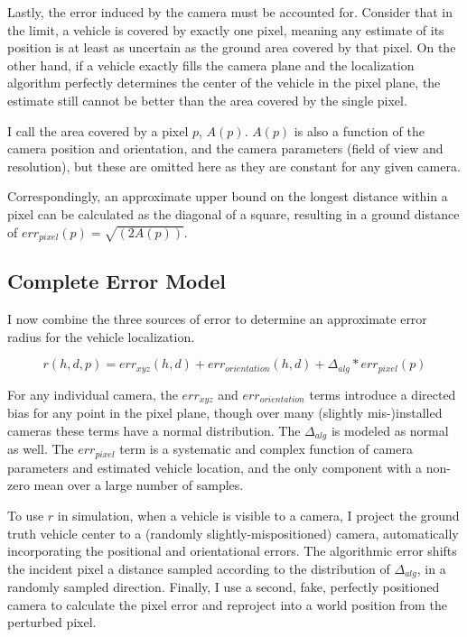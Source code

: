 \documentclass[a4paper,12pt,twoside,openright]{report}
\begin{document}
Lastly, the error induced by the camera must be accounted for. Consider that 
in the limit, a vehicle is covered by exactly one pixel, meaning any estimate
of its position is at least as uncertain as the ground area 
covered by that pixel. On the other hand, if a vehicle
exactly fills the camera plane and the localization algorithm perfectly determines
the center of the vehicle in the pixel plane, the estimate still cannot
be better than the area covered by the single pixel.

I call the area covered by a pixel $p$, $A(p)$. $A(p)$ is also a function of the camera
position and orientation, and the camera parameters (field of view and resolution),
but these are omitted here as they are constant for any given camera.

Correspondingly, an approximate upper bound on the longest distance
within a pixel can be calculated as the diagonal of a square,
resulting in a ground distance of $err_{pixel}(p) = \sqrt{(2A(p))}$. 


\subsection{Complete Error Model}
\label{sec:cameramodel:r}

I now combine the three sources of error to determine an approximate
error radius for the vehicle localization.

\[
    r(h,d,p) = err_{xyz}(h,d) + err_{orientation}(h,d) + \Delta_{alg}*err_{pixel}(p)
\]

For any individual camera, the $err_{xyz}$ and $err_{orientation}$ terms introduce
a directed bias for any point in the pixel plane, though over many (slightly mis-)installed cameras
these terms have a normal distribution. The $\Delta_{alg}$ is 
modeled as normal as well. The $err_{pixel}$ term is a systematic 
and complex function of camera parameters and estimated vehicle location, and
the only component with a non-zero mean over a large number of samples.

To use $r$ in simulation, when a vehicle is visible to a camera,
I project the ground truth vehicle center to a (randomly slightly-mispositioned) camera, 
automatically incorporating the positional and orientational errors.
The algorithmic error shifts the incident pixel a distance sampled according to the distribution 
of $\Delta_{alg}$, in a randomly sampled direction. 
Finally, I use a second, fake, perfectly positioned camera 
to calculate the pixel error and reproject into a world position from the perturbed pixel.
\end{document}
